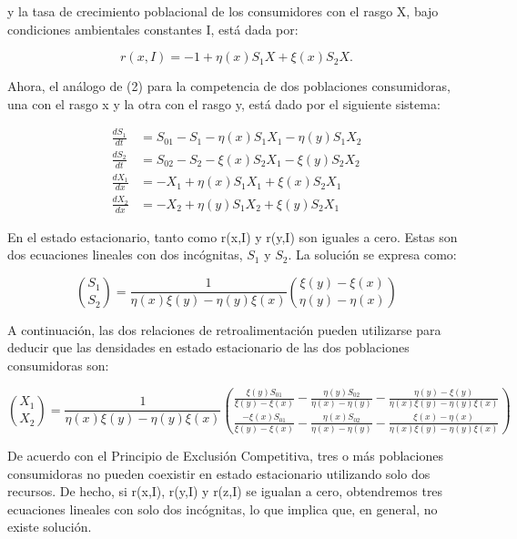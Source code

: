 y la tasa de crecimiento poblacional de los consumidores con el rasgo X, bajo condiciones ambientales constantes I, está dada por:

\begin{equation}
	r(x,I)=-1+\eta(x)S_1X+\xi(x)S_2X.
\end{equation}

Ahora, el análogo de (2) para la competencia de dos poblaciones consumidoras, una con el rasgo x y la otra con el rasgo y, está dado por el siguiente sistema:

\begin{equation}
	\begin{split}
		\frac{d S_1}{dt} & =S_{01}-S_1-\eta(x)S_1X_1-\eta(y)S_1X_2 \\  \frac{d S_2}{dt}&=S_{02}-S_2-\xi(x)S_2X_1-\xi(y)S_2X_2\\ \frac{d X_1}{dx}&=-X_1+\eta(x)S_1X_1+\xi(x)S_2X_1\\
		\frac{d X_2}{dx} & =-X_2+\eta(y)S_1X_2+\xi(y)S_2X_1
	\end{split}
\label{eq:S-M}
\end{equation}

En el estado estacionario, tanto como r(x,I) y r(y,I) son iguales a cero. Estas son dos ecuaciones lineales con dos incógnitas, $S_1$ y $S_2$. La solución se expresa como:

\begin{equation}
	\binom{S_1}{S_2}=\frac{1}{\eta(x)\xi(y)-\eta(y)\xi(x)}\binom{\xi(y)-\xi(x)}{\eta(y)-\eta(x)}
\end{equation}


A continuación, las dos relaciones de retroalimentación pueden utilizarse para deducir que las densidades en estado estacionario de las dos poblaciones consumidoras son:

\begin{equation}
	\binom{X_1}{X_2}=\frac{1}{\eta(x)\xi(y)-\eta(y)\xi(x)}\binom{\frac{\xi(y)S_{01}}{\xi(y)-\xi(x)}-\frac{\eta(y)S_{02}}{\eta(x)-\eta(y)}-\frac{\eta(y)-\xi(y)}{\eta(x)\xi(y)-\eta(y)\xi(x)}}{\frac{-\xi(x)S_{01}}{\xi(y)-\xi(x)}-\frac{\eta(x)S_{02}}{\eta(x)-\eta(y)}-\frac{\xi(x)-\eta(x)}{\eta(x)\xi(y)-\eta(y)\xi(x)}}
\end{equation}

De acuerdo con el Principio de Exclusión Competitiva, tres o más poblaciones consumidoras no pueden coexistir en estado estacionario utilizando solo dos recursos. De hecho, si r(x,I), r(y,I) y r(z,I) se igualan a cero, obtendremos tres ecuaciones lineales con solo dos incógnitas, lo que implica que, en general, no existe solución.




